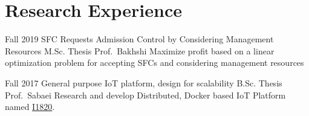 \section{Research Experience}

\cventry%
{Fall 2019}
{SFC Requests Admission Control by Considering Management Resources}
{M.Sc. Thesis}
{Prof.\ Bakhshi}
{}
{Maximize profit based on a linear optimization problem for accepting SFCs and considering management resources}

\cventry%
{Fall 2017}
{General purpose IoT platform, design for scalability}
{B.Sc. Thesis}
{Prof.\ Sabaei}
{}{%
  Research and develop Distributed, Docker based IoT Platform named \href{https://github.com/I1820}{I1820}.
}
